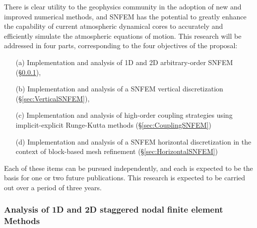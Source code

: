 \documentclass[11pt]{article}
\begin{document}
There is clear utility to the geophysics community in the adoption of new and improved numerical methods, and SNFEM has the potential to greatly enhance the capability of current atmospheric dynamical cores to accurately and efficiently simulate the atmospheric equations of motion.  This research will be addressed in four parts, corresponding to the four objectives of the proposal:
\begin{itemize}
\item[(a)] Implementation and analysis of 1D and 2D arbitrary-order SNFEM (\S \ref{sec:AnalysisSNFEM}),
\item[(b)] Implementation and analysis of a SNFEM vertical discretization (\S \ref{sec:VerticalSNFEM}),
\item[(c)] Implementation and analysis of high-order coupling strategies using implicit-explicit Runge-Kutta methods (\S \ref{sec:CouplingSNFEM})
\item[(d)] Implementation and analysis of a SNFEM horizontal discretization in the context of block-based mesh refinement (\S \ref{sec:HorizontalSNFEM})
\end{itemize}  Each of these items can be pursued independently, and each is expected to be the basis for one or two future publications.  This research is expected to be carried out over a period of three years.

\subsubsection{Analysis of 1D and 2D staggered nodal finite element Methods} \label{sec:AnalysisSNFEM}
\end{document}
